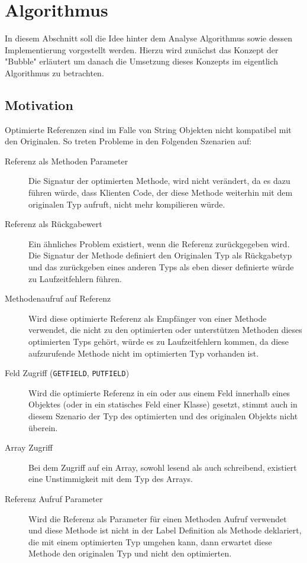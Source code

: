 \section{Algorithmus}

In diesem Abschnitt soll die Idee hinter dem Analyse Algorithmus sowie dessen
Implementierung vorgestellt werden. Hierzu wird zunächst das Konzept der "Bubble"
erläutert um danach die Umsetzung dieses Konzepts im eigentlich Algorithmus zu 
betrachten.

\subsection{Motivation}

Optimierte Referenzen sind im Falle von String Objekten nicht kompatibel mit den 
Originalen. So treten Probleme in den Folgenden Szenarien auf:

\begin{description}
	\item[Referenz als Methoden Parameter] Die Signatur der 
	optimierten Methode, wird nicht verändert, da es dazu führen würde, dass
	Klienten Code, der diese Methode weiterhin mit dem originalen Typ aufruft, 
	nicht mehr kompilieren würde.
	\item[Referenz als Rückgabewert] Ein ähnliches Problem existiert, wenn die 
	Referenz zurückgegeben wird. Die Signatur der Methode definiert den Originalen
	Typ als Rückgabetyp und das zurückgeben eines anderen Typs als eben dieser 
	definierte würde zu Laufzeitfehlern führen.
	\item[Methodenaufruf auf Referenz] Wird diese optimierte Referenz als Empfänger 
	von einer Methode verwendet, die nicht zu den optimierten oder unterstützen
	Methoden dieses optimierten Typs gehört, würde es zu Laufzeitfehlern kommen, 
	da diese aufzurufende Methode nicht im optimierten Typ vorhanden ist. 
	\item[Feld Zugriff (\texttt{GETFIELD}, \texttt{PUTFIELD})] Wird die optimierte 
	Referenz in ein oder aus einem Feld innerhalb eines Objektes (oder in ein 
	statisches Feld einer Klasse) gesetzt, stimmt auch in diesem Szenario der Typ
	des optimierten und des originalen Objekts nicht überein.
	\item[Array Zugriff] Bei dem Zugriff auf ein Array, sowohl lesend als auch 
	schreibend, existiert eine Unstimmigkeit mit dem Typ des Arrays.
	\item[Referenz Aufruf Parameter] Wird die Referenz als Parameter für einen
	Methoden Aufruf verwendet und diese Methode ist nicht in der Label Definition
	als Methode deklariert, die mit einem optimierten Typ umgehen kann, dann 
	erwartet diese Methode den originalen Typ und nicht den optimierten.
\end{description}

